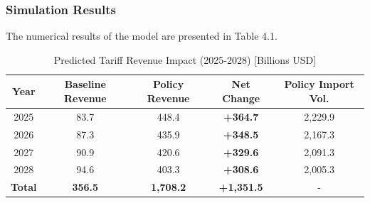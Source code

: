 \documentclass{apmcmthesis}
\begin{document}
\subsubsection{Simulation Results}
The numerical results of the model are presented in Table 4.1.

\begin{table}[htbp]
    \centering
    \caption{Predicted Tariff Revenue Impact (2025-2028) [Billions USD]}
    \begin{tabular}{ccccc}
        \toprule
        \textbf{Year} & \textbf{Baseline Revenue} & \textbf{Policy Revenue} & \textbf{Net Change} & \textbf{Policy Import Vol.} \\
        \midrule
        2025 & 83.7 & 448.4 & \textbf{+364.7} & 2,229.9 \\
        2026 & 87.3 & 435.9 & \textbf{+348.5} & 2,167.3 \\
        2027 & 90.9 & 420.6 & \textbf{+329.6} & 2,091.3 \\
        2028 & 94.6 & 403.3 & \textbf{+308.6} & 2,005.3 \\
        \midrule
        \textbf{Total} & \textbf{356.5} & \textbf{1,708.2} & \textbf{+1,351.5} & - \\
        \bottomrule
    \end{tabular}
    \label{tab:revenue_results}
\end{table}
\end{document}
